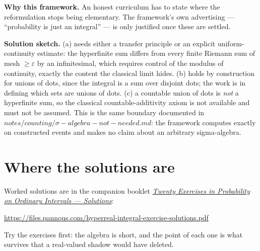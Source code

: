 \documentclass[11pt]{article}
\newcommand{\eps}{\varepsilon}
\begin{document}
\textbf{Why this framework.} An honest curriculum has to state where the
reformulation stops being elementary. The framework's own advertising ---
``probability is just an integral'' --- is only justified once these are settled.

\textbf{Solution sketch.} (a) needs either a transfer principle or an explicit
uniform-continuity estimate: the hyperfinite sum differs from every finite
Riemann sum of mesh $\ge  \eps$ by an infinitesimal, which requires control of
the modulus of continuity, exactly the content the classical limit hides.
(b) holds by construction for unions of dots, since the integral is a sum over
disjoint dots; the work is in defining which sets are unions of dots.
(c) a countable union of dots is \emph{not} a hyperfinite sum, so the classical
countable-additivity axiom is not available and must not be assumed. This is
the same boundary documented in $notes/counting/\sigma-algebra-not-needed.md$:
the framework computes exactly on constructed events and makes no claim about
an arbitrary sigma-algebra.


\section*{Where the solutions are}

Worked solutions are in the companion booklet
\href{https://files.pannous.com/hyperreal-integral-exercise-solutions.pdf}{\emph{Twenty Exercises in Probability on Ordinary Intervals --- Solutions}}:
\begin{center}\small\url{https://files.pannous.com/hyperreal-integral-exercise-solutions.pdf}\end{center}
Try the exercises first: the algebra is short, and the point of each one is
what survives that a real-valued shadow would have deleted.
\end{document}
